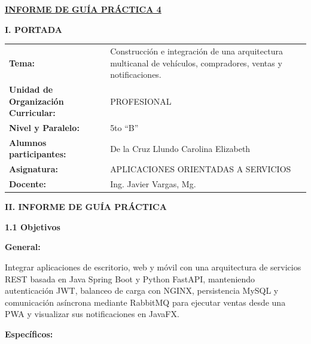\documentclass[11pt,a4paper]{article}
\renewcommand{\_}{\oldunderscore\allowbreak}
\begin{document}
\begin{center}
  \textbf{\underline{\large INFORME DE GUÍA PRÁCTICA 4}}
\end{center}

\vspace{0.3cm}

\noindent\textbf{I. PORTADA}

\vspace{0.2cm}

\noindent
\begin{tabularx}{\textwidth}{@{}p{5.5cm}X@{}}
  \textbf{Tema:} & Construcción e integración de una arquitectura multicanal de vehículos, compradores, ventas y notificaciones. \\[5pt]
  \textbf{Unidad de Organización Curricular:} & PROFESIONAL \\[5pt]
  \textbf{Nivel y Paralelo:} & 5to ``B'' \\[5pt]
  \textbf{Alumnos participantes:} & De la Cruz Llundo Carolina Elizabeth \\[5pt]
  \textbf{Asignatura:} & APLICACIONES ORIENTADAS A SERVICIOS \\[5pt]
  \textbf{Docente:} & Ing. Javier Vargas, Mg.
\end{tabularx}

\vspace{0.4cm}

\noindent\textbf{II. INFORME DE GUÍA PRÁCTICA}

\vspace{0.2cm}

\noindent\textbf{1.1 Objetivos}

\vspace{0.1cm}

\noindent\textbf{General:}

\noindent Integrar aplicaciones de escritorio, web y móvil con una arquitectura de servicios REST basada en Java Spring Boot y Python FastAPI, manteniendo autenticación JWT, balanceo de carga con NGINX, persistencia MySQL y comunicación asíncrona mediante RabbitMQ para ejecutar ventas desde una PWA y visualizar sus notificaciones en JavaFX.

\vspace{0.1cm}

\noindent\textbf{Específicos:}
\end{document}
